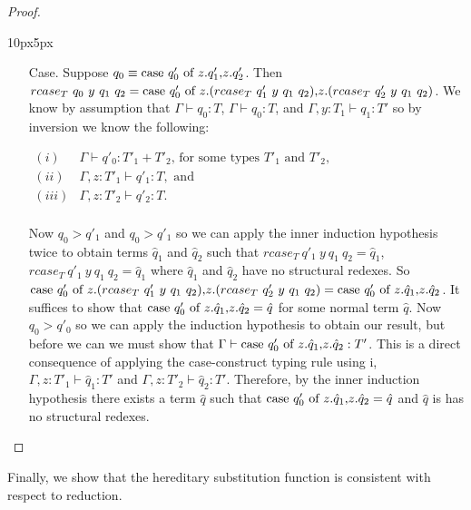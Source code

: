 \begin{proof}
\begin{changemargin}{10px}{5px}
\begin{itemize}
\begin{itemize}
\begin{itemize}
    \item[Case.] Suppose $q_0 \equiv \mbox{case}\ q'_0\ \text{of}\ z\text{.}q'_1\text{,}z\text{.}q'_2$.  Then \\
      $rcase_{T}\ q_0\ y\ q_1\ q_2 = \ccon{q'_0}{z}{(rcase_{T}\ q'_1\ y\ q_1\ q_2)}{(rcase_{T}\ q'_2\ y\ q_1\ q_2)}$.
      We know by assumption that $\Gamma \vdash q_0:T$, $\Gamma \vdash q_0:T$, and $\Gamma, y:T_1 \vdash q_1:T'$
      so by inversion we know the following:
      \begin{center}
        \begin{math}
          \begin{array}{lll}
            (i) & \Gamma \vdash q'_0:T'_1 + T'_2 \text{, for some types } T'_1 \text{ and } T'_2,\\
            (ii) & \Gamma, z:T'_1 \vdash q'_1:T, \text{ and }\\
            (iii) & \Gamma, z:T'_2 \vdash q'_2:T.\\
          \end{array}
        \end{math}
      \end{center}
      Now $q_0 > q'_1$ and $q_0 > q'_1$ so we can apply the inner induction hypothesis twice to obtain terms $\hat{q}_1$ and
      $\hat{q}_2$ such that $rcase_{T}\ q'_1\ y\ q_1\ q_2 = \hat{q}_1$, $rcase_{T}\ q'_1\ y\ q_1\ q_2 = \hat{q}_1$ where 
      $\hat{q}_1$ and $\hat{q}_2$ have no structural redexes. So
      $\ccon{q'_0}{z}{(rcase_{T}\ q'_1\ y\ q_1\ q_2)}{(rcase_{T}\ q'_2\ y\ q_1\ q_2)} = 
      \ccon{q'_0}{z}{\hat{q}_1}{\hat{q}_2}$.  It suffices to show that $\mbox{case}\ q'_0\ \text{of}\ z\text{.}\hat{q}_1\text{,}z\text{.}\hat{q}_2 = \hat{q}$ 
      for some normal term $\hat{q}$.  Now $q_0 > q'_0$ so we can apply the induction hypothesis
      to obtain our result, but before we can we must show that $\Gamma \vdash \mbox{case}\ q'_0\ \text{of}\ z\text{.}\hat{q}_1\text{,}z\text{.}\hat{q}_2:T'$.
      This is a direct consequence of applying the case-construct typing rule using i, $\Gamma, z:T'_1 \vdash \hat{q}_1:T'$
      and $\Gamma, z:T'_2 \vdash \hat{q}_2:T'$.  Therefore, by the inner induction hypothesis there exists a term $\hat{q}$ 
      such that $\mbox{case}\ q'_0\ \text{of}\ z\text{.}\hat{q}_1\text{,}z\text{.}\hat{q}_2 = \hat{q}$ and $\hat{q}$ is has no structural redexes.
    \end{itemize}
  \end{itemize}
\end{itemize}
\end{changemargin}
\end{proof}
\noindent
Finally, we show that the hereditary substitution function is
consistent with respect to reduction.
